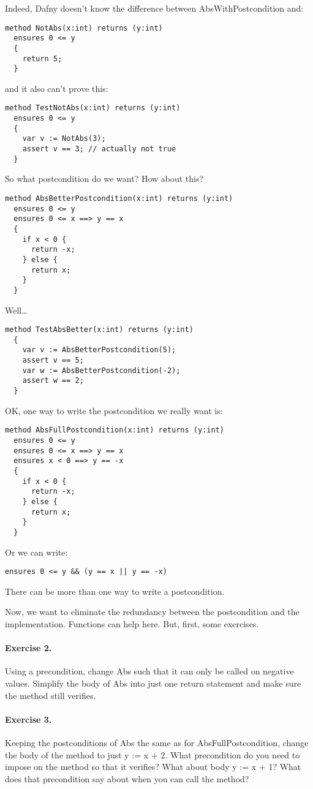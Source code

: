 \documentclass[11pt]{article}
\begin{document}
Indeed, Dafny doesn't know the difference between \textsf{AbsWithPostcondition} and:
\begin{lstlisting}[language=dafny]
  method NotAbs(x:int) returns (y:int)
  ensures 0 <= y
  {
    return 5;
  }
\end{lstlisting}
and it also can't prove this:
\begin{lstlisting}[language=dafny]
  method TestNotAbs(x:int) returns (y:int)
  ensures 0 <= y
  {
    var v := NotAbs(3);
    assert v == 3; // actually not true
  }
\end{lstlisting}
So what postcondition do we want? How about this?
\begin{lstlisting}[language=dafny]
  method AbsBetterPostcondition(x:int) returns (y:int)
  ensures 0 <= y
  ensures 0 <= x ==> y == x
  {
    if x < 0 {
      return -x;
    } else {
      return x;
    }
  }
\end{lstlisting}
Well\ldots
\begin{lstlisting}[language=dafny]
  method TestAbsBetter(x:int) returns (y:int)
  {
    var v := AbsBetterPostcondition(5);
    assert v == 5;
    var w := AbsBetterPostcondition(-2);
    assert w == 2;
  }
\end{lstlisting}
OK, one way to write the postcondition we really want is:
\begin{lstlisting}[language=dafny]
  method AbsFullPostcondition(x:int) returns (y:int)
  ensures 0 <= y
  ensures 0 <= x ==> y == x
  ensures x < 0 ==> y == -x
  {
    if x < 0 {
      return -x;
    } else {
      return x;
    }
  }
\end{lstlisting}
Or we can write:
\begin{lstlisting}[language=dafny]
  ensures 0 <= y && (y == x || y == -x)
\end{lstlisting}
There can be more than one way to write a postcondition.

Now, we want to eliminate the redundancy between the postcondition and the implementation.
Functions can help here. But, first, some exercises.

\paragraph{Exercise 2.} Using a precondition, change \textsf{Abs} such that it can only be called
on negative values. Simplify the body of \textsf{Abs} into just one return statement and make sure
the method still verifies.

\paragraph{Exercise 3.} Keeping the postconditions of \textsf{Abs} the same as for
\textsf{AbsFullPostcondition}, change the body of the method to just \textsf{y := x + 2}. What
precondition do you need to impose on the method so that it verifies? What about body
\textsf{y := x + 1}? What does that precondition say about when you can call the method?
\end{document}
